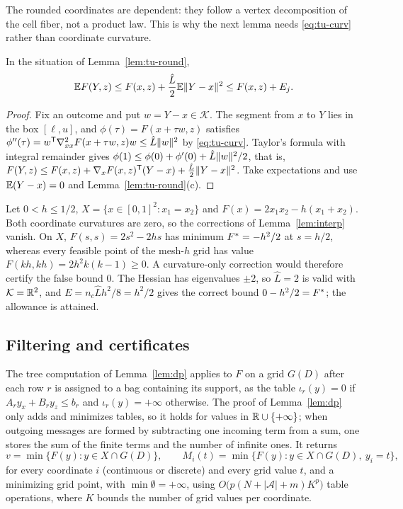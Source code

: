 The rounded coordinates are dependent: they follow a vertex decomposition of
the cell fiber, not a product law. This is why the next lemma needs
\eqref{eq:tu-curv} rather than coordinate curvature.

\begin{lemma}\label{lem:tu-allow}
In the situation of Lemma~\ref{lem:tu-round},
\[
\mathbb E F(Y,z)\le F(x,z)+\frac{\hat L}2\mathbb E\lVert Y-x\rVert^2\le F(x,z)+E_j .
\]
\end{lemma}

\begin{proof}
Fix an outcome and put $w=Y-x\in\mathcal K$. The segment from $x$ to $Y$ lies
in the box $[\ell,u]$, and $\phi(\tau)=F(x+\tau w,z)$ satisfies
$\phi''(\tau)=w^{\mathsf T}\nabla^2_{xx}F(x+\tau w,z)w\le\hat L\lVert w\rVert^2$ by
\eqref{eq:tu-curv}. Taylor's formula with integral remainder gives
$\phi(1)\le\phi(0)+\phi'(0)+\hat L\lVert w\rVert^2/2$, that is,
$F(Y,z)\le F(x,z)+\nabla_xF(x,z)^{\mathsf T}(Y-x)+\frac{\hat L}2\lVert Y-x\rVert^2$.
Take expectations and use $\mathbb E(Y-x)=0$ and Lemma~\ref{lem:tu-round}(c).
\end{proof}

\begin{example}\label{ex:tu-fullcurv}
Let $0<h\le1/2$, $X=\{x\in[0,1]^2:x_1=x_2\}$ and
$F(x)=2x_1x_2-h(x_1+x_2)$. Both coordinate curvatures are zero, so the
corrections of Lemma~\ref{lem:interp} vanish. On $X$,
$F(s,s)=2s^2-2hs$ has minimum $F^*=-h^2/2$ at $s=h/2$, whereas every feasible
point of the mesh-$h$ grid has value $F(kh,kh)=2h^2k(k-1)\ge0$. A
curvature-only correction would therefore certify the false bound $0$. The
Hessian has eigenvalues $\pm2$, so $\hat L=2$ is valid with
$\mathcal K=\mathbb R^2$, and $E=n_c\hat Lh^2/8=h^2/2$ gives the correct bound
$0-h^2/2=F^*$; the allowance is attained.
\end{example}

\subsection{Filtering and certificates}\label{sec:tu-filter}

The tree computation of Lemma~\ref{lem:dp} applies to $F$ on a grid $G(D)$
after each row $r$ is assigned to a bag containing its support, as the table
$\iota_r(y)=0$ if $A_ry_x+B_ry_z\le b_r$ and $\iota_r(y)=+\infty$ otherwise.
The proof of Lemma~\ref{lem:dp} only adds and minimizes tables, so it holds
for values in $\mathbb R\cup\{+\infty\}$; when outgoing messages are formed by
subtracting one incoming term from a sum, one stores the sum of the finite
terms and the number of infinite ones. It returns
\[
v=\min\{F(y):y\in X\cap G(D)\},\qquad
M_i(t)=\min\{F(y):y\in X\cap G(D),\ y_i=t\},
\]
for every coordinate $i$ (continuous or discrete) and every grid value $t$,
and a minimizing grid point, with $\min\emptyset=+\infty$, using
$O\bigl(p(N+\lvert\mathcal A\rvert+m)K^p\bigr)$ table operations, where $K$
bounds the number of grid values per coordinate.

